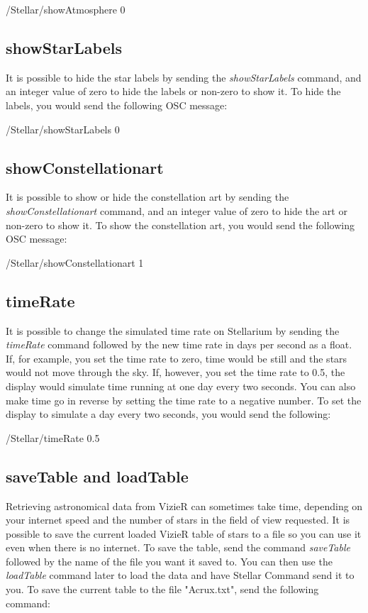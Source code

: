 \begin{syntax}	
	\medskip
	/Stellar/showAtmosphere 0
	\medskip
\end{syntax}

 \subsection{showStarLabels }
It is possible to hide the star labels  by sending the \textit{showStarLabels} command, and an integer value of zero to hide the labels or non-zero to show it. To hide the labels, you would send the following OSC message:

\begin{syntax}	
	\medskip
	/Stellar/showStarLabels 0
	\medskip
\end{syntax}

 \subsection{showConstellationart }
It is possible to show or hide the constellation art by sending the \textit{showConstellationart} command, and an integer value of zero to hide the art or non-zero to show it. To show the constellation art, you would send the following OSC message:

\begin{syntax}	
	\medskip
	/Stellar/showConstellationart 1
	\medskip
\end{syntax}

\subsection{timeRate}
It is possible to change the simulated time rate on Stellarium by sending the \textit{timeRate} command followed by the new time rate in days per second as a float. If, for example, you set the time rate to zero, time would be still and the stars would not move through the sky. If, however, you set the time rate to 0.5, the display would simulate time running at one day every two seconds. You can also make time go in reverse by setting the time rate to a negative number. To set the display to simulate a day every two seconds, you would send the following:

\begin{syntax}	
	\medskip
	/Stellar/timeRate 0.5
	\medskip
\end{syntax}

\subsection{saveTable and loadTable}
Retrieving astronomical data from VizieR can sometimes take time, depending on your internet speed and the number of stars in the field of view requested. It is possible to save the current loaded VizieR table of stars to a file so you can use it even when there is no internet. To save the table, send the command \textit{saveTable} followed by the name of the file you want it saved to. You can then use the \textit{loadTable} command later to load the data and have Stellar Command send it to you.
To save the current table to the file "Acrux.txt", send the following command:
 
